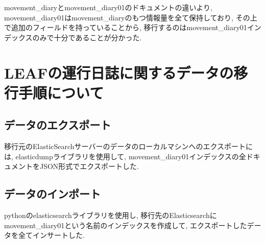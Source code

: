 movement\_diaryとmovement\_diary01のドキュメントの違いより, movement\_diary01はmovement\_diaryのもつ情報量を全て保持しており, その上で追加のフィールドを持っていることから, 移行するのはmovement\_diary01インデックスのみで十分であることが分かった.

\section{LEAFの運行日誌に関するデータの移行手順について}

\subsection{データのエクスポート}
移行元のElasticSearchサーバーのデータのローカルマシンへのエクスポートには, elasticdumpライブラリを使用して, movement\_diary01インデックスの全ドキュメントをJSON形式でエクスポートした.

\subsection{データのインポート}
pythonのelasticsearchライブラリを使用し, 移行先のElasticsearchにmovement\_diary01という名前のインデックスを作成して, エクスポートしたデータを全てインサートした.





